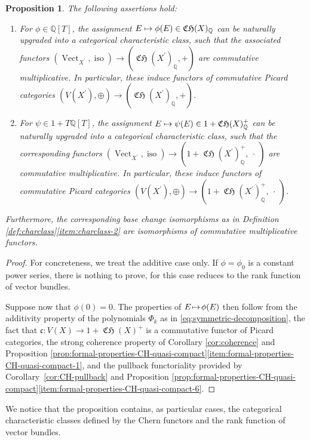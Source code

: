 \documentclass[11pt]{article}
\newcommand\mto{\mathchoice{\longmapsto}{\mapsto}{\mapsto}{\mapsto}}
\theoremstyle{plain}
\newtheorem{proposition}[theorem]{Proposition}
\theoremstyle{definition}
\newcommand{\QBbb}{\mathbb Q}
\newcommand{\cfrak}{\mathfrak c}
\DeclareMathOperator{\CHfrak}{\mathfrak{CH}}
\DeclareMathOperator{\iso}{iso}
\DeclareMathOperator{\Vect}{Vect}
\begin{document}
\begin{proposition}\label{prop:additcharclass}
The following assertions hold:
\begin{enumerate}\label{enum:characteristic-classes}
\item\label{enum:characteristic-classes-1} For $\phi\in\QBbb[T]$, the assignment $E\mto \phi(E)\in\CHfrak(X)_{\QBbb}$ can be naturally upgraded into a categorical characteristic class, such that the associated functors \hbox{$(\Vect_{X^{\prime}},\iso) \to (\CHfrak(X^{\prime})_{\QBbb}, +)$} are commutative multiplicative. In particular, these induce functors of commutative Picard categories $(V(X^{\prime}),\oplus) \to (\CHfrak(X^{\prime})_{\QBbb}, +)$.
\item\label{enum:characteristic-classes-2} For $\psi\in 1+T\QBbb[T]$, the assignment $E \mto \psi(E) \in 1+\CHfrak(X)_{\QBbb}^{+}$ can be naturally upgraded into a categorical characteristic class, such that the corresponding functors $(\Vect_{X^{\prime}},\iso)\to (1+\CHfrak(X^{\prime})_{\QBbb}^{+},\ \cdot\ )$ are commutative multiplicative. In particular, these induce functors of commutative Picard categories $(V(X^{\prime}),\oplus) \to (1+\CHfrak(X^{\prime})_{\QBbb}^{+}, \ \cdot\ )$.
\end{enumerate}
Furthermore, the corresponding base change isomorphisms as in Definition \ref{def:charclass}\eqref{item:charclass-2} are isomorphisms of commutative multiplicative functors.
\end{proposition}
\begin{proof}
For concreteness, we treat the additive case only. If $\phi=\phi_{0}$ is a constant power series, there is nothing to prove, for this case reduces to the rank function of vector bundles.

Suppose now that $\phi(0)\!=\!0$. The properties of $E\!\mto\! \phi(E)$ then follow from the addi\-tivity property of the polynomials $\Phi_{k}$ as in \eqref{eq:symmetric-decomposition}, the fact that \hbox{$\cfrak\colon V(X)\!\to\! 1\!+\!\CHfrak(X)^{+}$} is a commutative functor of Picard categories, the strong coherence property of Corollary \ref{cor:coherence} and Proposition \ref{prop:formal-properties-CH-quasi-compact}\eqref{item:formal-properties-CH-quasi-compact-1}, and the pullback functoriality provided by Corollary~\ref{cor:CH-pullback} and Proposition \ref{prop:formal-properties-CH-quasi-compact}\eqref{item:formal-properties-CH-quasi-compact-6}.
\end{proof}

We notice that the proposition contains, as particular cases, the categorical characteristic classes defined by the Chern functors and the rank function of vector bundles.
\end{document}
